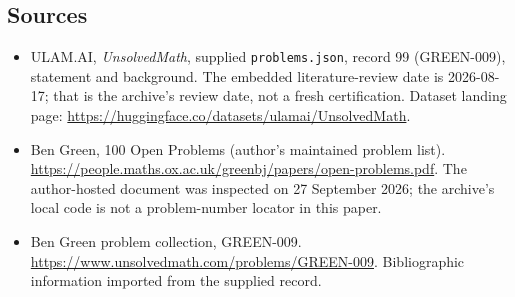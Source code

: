 \documentclass[11pt,a4paper]{article}
\begin{document}
\subsection{Sources}

{\small

\begin{itemize}

\item[\hypertarget{source:99:1}{S1}] ULAM.AI, \emph{UnsolvedMath}, supplied \texttt{problems.json}, record 99 (GREEN-009), statement and background. The embedded literature-review date is 2026-08-17; that is the archive’s review date, not a fresh certification. Dataset landing page: \url{https://huggingface.co/datasets/ulamai/UnsolvedMath}.

\item[\hypertarget{source:99:2}{S2}] Ben Green, 100 Open Problems (author’s maintained problem list). \url{https://people.maths.ox.ac.uk/greenbj/papers/open-problems.pdf}. The author-hosted document was inspected on 27 September 2026; the archive’s local code is not a problem-number locator in this paper.

\item[\hypertarget{source:99:3}{S3}] Ben Green problem collection, GREEN-009. \url{https://www.unsolvedmath.com/problems/GREEN-009}. Bibliographic information imported from the supplied record.

\end{itemize}

}

\label{end:99}
\end{document}
